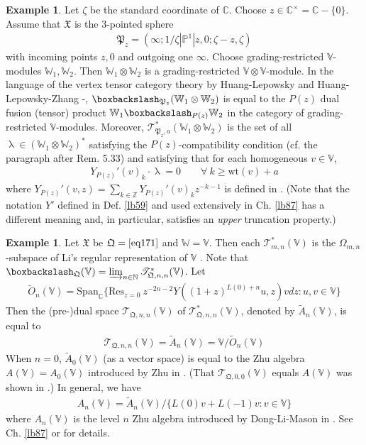 \documentclass[11pt,b5paper,notitlepage]{article}
\theoremstyle{definition}
\newtheorem{eg}[df]{Example}
\theoremstyle{plain}
\newcommand{\fk}{\mathfrak}
\newcommand{\wtd}{\widetilde}
\newcommand{\Res}{\mathrm{Res}}
\newcommand{\Span}{\mathrm{Span}}
\newcommand{\scr}{\mathscr}
\newcommand{\Vbb}{\mathbb V}
\newcommand{\Wbb}{\mathbb W}
\newcommand{\Cbb}{\mathbb C}
\newcommand{\Nbb}{\mathbb N}
\newcommand{\Zbb}{\mathbb Z}
\newcommand{\Pbb}{\mathbb P}
\newcommand{\wt}{\mathrm{wt}}
\newcommand{\<}{\left\langle}
\renewcommand{\>}{\right\rangle}
\newcommand{\bbs}{\boxbackslash}
\newcommand{\fq}{{\mathfrak Q}}
\numberwithin{equation}{subsection}
\begin{document}
\begin{eg}
Let $\zeta$ be the standard coordinate of $\Cbb$. Choose $z\in\Cbb^\times=\Cbb-\{0\}$. Assume that $\fk X$ is the $3$-pointed sphere
\begin{align}
\fk P_z=(\infty;1/\zeta| \Pbb^1|z,0;\zeta-z,\zeta)
\end{align}
with incoming points $z,0$ and outgoing one $\infty$. Choose grading-restricted $\Vbb$-modules $\Wbb_1,\Wbb_2$. Then $\Wbb_1\otimes\Wbb_2$ is a grading-restricted $\Vbb\otimes\Vbb$-module. In the language of the vertex tensor category theory by Huang-Lepowsky \cite{HL-tensor-1,HL-tensor-2,HL-tensor-3,Hua-tensor-4} and Huang-Lepowsky-Zhang \cite{HLZ1,HLZ2}-\cite{HLZ8}, $\bbs_{\fk P_z}(\Wbb_1\otimes \Wbb_2)$ is equal to the $P(z)$ dual fusion (tensor) product $\Wbb_1\bbs_{P(z)}\Wbb_2$ in the category of grading-restricted $\Vbb$-modules. Moreover, $\scr T_{\fk P_z,a}^*(\Wbb_1\otimes\Wbb_2)$ is the set of all $\uplambda\in(\Wbb_1\otimes\Wbb_2)^*$ satisfying the $P(z)$-compatibility condition (cf. \cite[Sec. 5.2]{HLZ4} the paragraph after Rem. 5.33) and satisfying that for each homogeneous $v\in \Vbb$,
\begin{align}
Y_{P(z)}'(v)_k\cdot\uplambda=0\qquad\forall~k\geq\wt(v)+a
\end{align}
where $Y_{P(z)}'(v,z)=\sum_{k\in\Zbb}Y_{P(z)}'(v)_kz^{-k-1}$ is defined in \cite[Def. 5.3]{HLZ4}. (Note that the notation $Y'$ defined in Def. \ref{lb59} and used extensively in Ch. \ref{lb87} has a different meaning and, in particular, satisfies an \emph{upper} truncation property.)
\end{eg}



\begin{eg}\label{lb92}
Let $\fk X$ be $\fq=\eqref{eq171}$ and $\Wbb=\Vbb$. Then each $\scr T_{m,n}^*(\Vbb)$ is the $\Omega_{m,n}$-subspace of Li's regular representation of $\Vbb$ \cite{Li-regular-rep,LS-twisted-regular-rep}. Note that $\bbs_\fq(\Vbb)=\varinjlim_{n\in\Nbb}\scr T_{\fq,n,n}^*(\Vbb)$.  Let 
\begin{gather}
\wtd O_n(\Vbb)=\Span_\Cbb\big\{\Res_{z=0}~z^{-2n-2}Y((1+z)^{L(0)+n}u,z)vdz:u,v\in\Vbb  \big\}
\end{gather}
Then the (pre-)dual space $\scr T_{\fq,n,n}(\Vbb)$ of $\scr T_{\fq,n,n}^*(\Vbb)$, denoted by $\wtd A_n(\Vbb)$, is equal to
\begin{gather}
\scr T_{\fq,n,n}(\Vbb)=\wtd A_n(\Vbb)=\Vbb/\wtd O_n(\Vbb)
\end{gather}
When $n=0$, $\wtd A_0(\Vbb)$ (as a vector space) is equal to the Zhu algebra $A(\Vbb)=A_0(\Vbb)$ introduced by Zhu in \cite{Zhu-modular-invariance}. (That $\scr T_{\fq,0,0}(\Vbb)$ equals $A(\Vbb)$ was shown in \cite[Prop. 7.2.2 and A.2.7]{NT-P1_conformal_blocks}.) In general, we have
\begin{align}
A_n(\Vbb)=\wtd A_n(\Vbb)/\{L(0)v+L(-1)v:v\in\Vbb\}
\end{align}
where $A_n(\Vbb)$ is the level $n$ Zhu algebra introduced by Dong-Li-Mason in \cite{DLM-Zhu}. See Ch. \ref{lb87} or \cite{Li-regular-AnV,Li-regular-bimodules} for details.
\end{eg}
\end{document}
